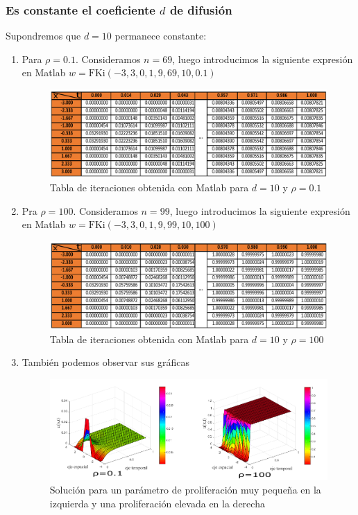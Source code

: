 \subsubsection{Es constante el coeficiente $d$ de difusión}
Supondremos que $d=10$ permanece constante:

\begin{enumerate}
	\item Para $\rho=0\mbox{.}1$. Consideramos $n=69$, luego introducimos la siguiente expresión en Matlab $w=\text{FKi}(-3,3,0,1,9,69,10,0\mbox{.}1)$
	\begin{figure}[H]
		\centering
		\includegraphics[scale=0.9]{simulacion/tabladrho01.pdf}
		\caption{{\footnotesize Tabla de iteraciones obtenida con Matlab para $d=10$ y $\rho =0\mbox{.}1$}}
	\end{figure}
	\item Pra $\rho=100$. Consideramos $n=99$, luego introducimos la siguiente expresión en Matlab $w=\text{FKi}(-3,3,0,1,9,99,10,100)$
		\begin{figure}[H]
			\centering
			\includegraphics[scale=0.9]{simulacion/tabladrho100.pdf}
			\caption{{\footnotesize Tabla de iteraciones obtenida con Matlab para $d=10$ y $\rho =100$}}
		\end{figure}
	\item También podemos observar sus gráficas 
		\begin{figure}[H]
			\centering
			\includegraphics[scale=1]{simulacion/graficoderho.pdf}
			\caption{{\footnotesize Solución para un parámetro de proliferación muy pequeña en la izquierda y una proliferación elevada en la derecha}}
			\label{figuraparaRHO}
		\end{figure}
\end{enumerate}
 

